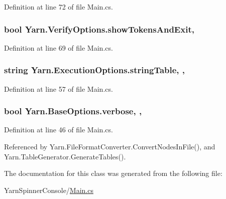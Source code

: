 Definition at line 72 of file Main.\-cs.

\hypertarget{a00169_ab1a387df201e3e136c15e5744219628d}{
\subsubsection[{show\-Tokens\-And\-Exit}]{\setlength{\rightskip}{0pt plus 5cm}bool Yarn.\-Verify\-Options.\-show\-Tokens\-And\-Exit\hspace{0.3cm}{\ttfamily [get]}, {\ttfamily [set]}}}\label{a00169_ab1a387df201e3e136c15e5744219628d}


Definition at line 69 of file Main.\-cs.

\hypertarget{a00099_a7e43c3b73722956cb0f5d507e4eef527}{
\subsubsection[{string\-Table}]{\setlength{\rightskip}{0pt plus 5cm}string Yarn.\-Execution\-Options.\-string\-Table\hspace{0.3cm}{\ttfamily [get]}, {\ttfamily [set]}, {\ttfamily [inherited]}}}\label{a00099_a7e43c3b73722956cb0f5d507e4eef527}


Definition at line 57 of file Main.\-cs.

\hypertarget{a00040_ada4d83d1756918f362d55f6649b82b17}{
\subsubsection[{verbose}]{\setlength{\rightskip}{0pt plus 5cm}bool Yarn.\-Base\-Options.\-verbose\hspace{0.3cm}{\ttfamily [get]}, {\ttfamily [set]}, {\ttfamily [inherited]}}}\label{a00040_ada4d83d1756918f362d55f6649b82b17}


Definition at line 46 of file Main.\-cs.



Referenced by Yarn.\-File\-Format\-Converter.\-Convert\-Nodes\-In\-File(), and Yarn.\-Table\-Generator.\-Generate\-Tables().



The documentation for this class was generated from the following file\-:\begin{DoxyCompactItemize}
\item 
Yarn\-Spinner\-Console/\hyperlink{a00300}{Main.\-cs}\end{DoxyCompactItemize}
